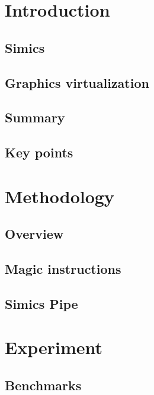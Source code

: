 \documentclass{beamer}
\begin{document}
	

	\section{Introduction}
	\subsection{Simics}
	
	\subsection{Graphics virtualization}
	
	\subsection{Summary}
	
	\subsection{Key points}
	

	\section{Methodology}
	\subsection{Overview}
	
	\subsection{Magic instructions}
	
	\subsection{Simics Pipe}
	

	\section{Experiment}
	\subsection{Benchmarks}
	
\end{document}
